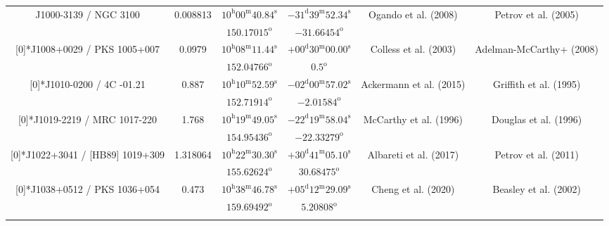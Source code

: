 \begin{landscape}
\begin{longtable}{cccccc}
  \multirow{2}[0]{*}{J1000-3139 / NGC 3100} & \multirow{2}[0]{*}{0.008813} &  
    $10^\text{h}00^\text{m}40.84^\text{s} $  & $ -31^\text{d}39^\text{m}52.34^\text{s} $  & 
    \multirow{2}[0]{*}{Ogando et al. (2008) \cite{RedRef35_2008}}& \multirow{2}[0]{*}{Petrov et al. (2005) \cite{CoordRef35_2005}} \\*
    & & $150.17015^\text{o}$ & $-31.66454^\text{o}$ & & \\ \addlinespace 

  \multirow{2}[0]{*}{J1008+0029 / PKS 1005+007} & \multirow{2}[0]{*}{0.0979} &  
    $ 10^\text{h}08^\text{m}11.44^\text{s}$  & $+00^\text{d}30^\text{m}00.00^\text{s}$  & 
    \multirow{2}[0]{*}{Colless et al. (2003) \cite{RedRef36_2003}}& \multirow{2}[0]{*}{Adelman-McCarthy+ (2008) \cite{CoordRef28_2008}} \\*
    & & $152.04766^\text{o}$ & $0.5^\text{o}$ & & \\ \addlinespace 
  \multirow{2}[0]{*}{J1010-0200 / 4C -01.21} & \multirow{2}[0]{*}{0.887} &  
    $10^\text{h}10^\text{m}52.59^\text{s}$  & $-02^\text{d}00^\text{m}57.02^\text{s}$  & 
    \multirow{2}[0]{*}{Ackermann et al. (2015) \cite{RedRef37_2015}}& \multirow{2}[0]{*}{Griffith et al. (1995) \cite{CoordRef37_1995}} \\*
    & & $152.71914^\text{o}$ & $-2.01584^\text{o}$ & & \\ \addlinespace 

  \multirow{2}[0]{*}{J1019-2219 / MRC 1017-220} & \multirow{2}[0]{*}{1.768} &  
    $10^\text{h}19^\text{m}49.05^\text{s}$  & $-22^\text{d}19^\text{m}58.04^\text{s}$  & 
    \multirow{2}[0]{*}{McCarthy et al. (1996)\cite{RedRef38_1996}}& \multirow{2}[0]{*}{Douglas et al. (1996) \cite{CoordRef10_1996}} \\*
    & & $154.95436^\text{o}$ & $-22.33279^\text{o}$ & & \\ \addlinespace 

  \multirow{2}[0]{*}{J1022+3041 / [HB89] 1019+309} & \multirow{2}[0]{*}{1.318064} &  
    $10^\text{h}22^\text{m}30.30^\text{s}$  & $+30^\text{d}41^\text{m}05.10^\text{s}$  & 
    \multirow{2}[0]{*}{Albareti et al. (2017) \cite{RedRef9_2017}}& \multirow{2}[0]{*}{Petrov et al. (2011) \cite{CoordRef31_2011}} \\*
    & & $ 155.62624^\text{o}$ & $ 30.68475^\text{o}$ & & \\ \addlinespace 

  \multirow{2}[0]{*}{J1038+0512 / PKS 1036+054} & \multirow{2}[0]{*}{0.473} &  
    $10^\text{h}38^\text{m}46.78^\text{s}$  & $+05^\text{d}12^\text{m}29.09^\text{s}$  & 
    \multirow{2}[0]{*}{Cheng et al. (2020) \cite{RedRef20_2020}}& \multirow{2}[0]{*}{Beasley et al. (2002) \cite{CoordRef4_2002}} \\*
    & & $159.69492^\text{o}$ & $5.20808^\text{o}$ & & \\ \addlinespace 


\end{longtable}
\end{landscape}
